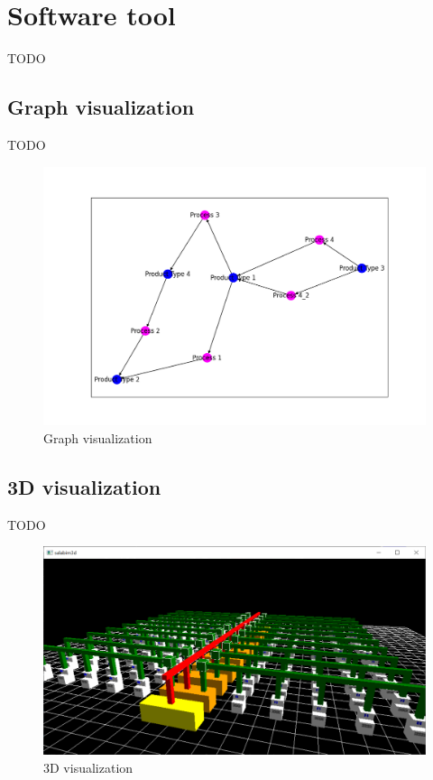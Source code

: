 \documentclass{article}
\begin{document}
    \section{Software tool}
    \label{sec:tool}
    TODO

    \subsection{Graph visualization}
    TODO

    \begin{figure}
        \includegraphics[width=\textwidth]{../../screenshots/networkx.png}
        \caption{Graph visualization}
    \end{figure}

    \subsection{3D visualization}
    TODO

    \begin{figure}
        \includegraphics[width=\textwidth]{../../screenshots/salabim.png}
        \caption{3D visualization}
    \end{figure}
\end{document}
